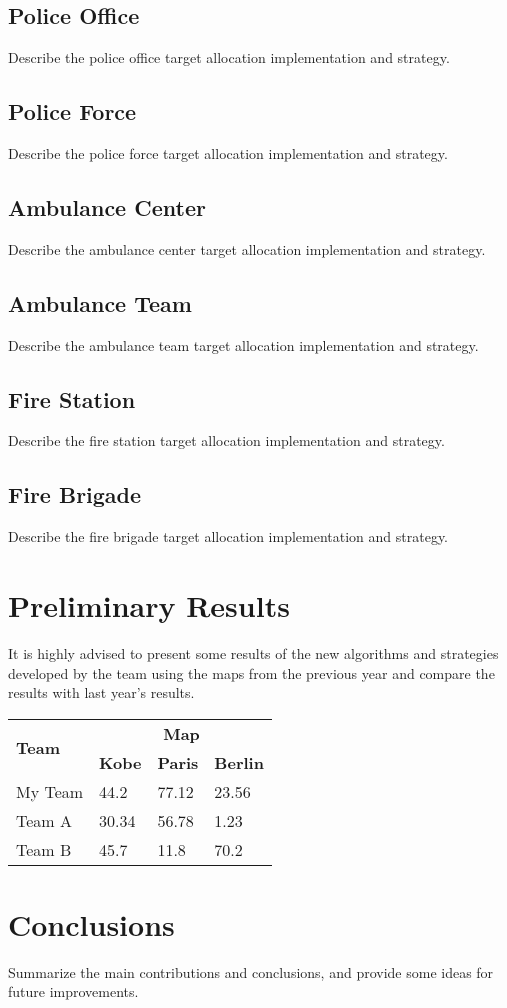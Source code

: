 \documentclass[runningheads,a4paper]{llncs}
\begin{document}
\subsection{Police Office}
Describe the police office target allocation implementation and strategy.
\subsection{Police Force}
Describe the police force target allocation implementation and strategy.
\subsection{Ambulance Center}
Describe the ambulance center target allocation implementation and strategy.
\subsection{Ambulance Team}
Describe the ambulance team target allocation implementation and strategy.
\subsection{Fire Station}
Describe the fire station target allocation implementation and strategy.
\subsection{Fire Brigade}
Describe the fire brigade target allocation implementation and strategy.
\section{Preliminary Results}
It is highly advised to present some results of the new algorithms and
strategies developed by the team using the maps from the previous year and
compare the results with last year's results.
\begin{table}
  \begin{tabular}{llll}
    \hline
    \multirow{2}{*}{\textbf{Team}}  & \multicolumn{3}{c}{\textbf{Map}}\\
    \cline{2-4}
                                    & \textbf{Kobe} & \textbf{Paris}  & \textbf{Berlin}\\
    \hline
    My Team                         & 44.2          & 77.12           & 23.56\\
    Team A                          & 30.34         & 56.78           & 1.23\\
    Team B                          & 45.7          & 11.8            & 70.2\\
    \hline
  \end{tabular}
\end{table}
\section{Conclusions}
Summarize the main contributions and conclusions, and provide some ideas for
future improvements.


\end{document}
